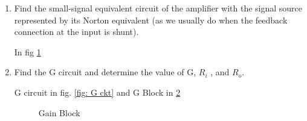 \begin{enumerate}[label=\thesection.\arabic*.,ref=\thesection.\theenumi]
 Applying KCL at collector node
 \begin{multline}
    \frac{V_{o} - 15}{5.6*10^3} + I_{C} + I_{f} = 0\\
     \text{\brak{Since,I_{C} = H I_{B}}}\\
     \frac{V_{o} - 15}{5.6*10^3} + H I_{B} + \brak{I_{B} + I_{S}} = 0\\
     \frac{V_{o} - 15}{5.6*10^3} + \brak{100 + 1}I_{B} + \brak{0.07*10^{-3}} = 0\\
     \implies V_{o} = 14.608 - \brak{565.5*10^3}I_{B} 
     \label{eq:ee17btech11031_fed2}
 \end{multline}
 Subtracting \ref{eq:ee17btech11031_fed1} from \ref{eq:ee17btech11031_fed2}, we get,
 \begin{align}
     I_{B} &= 16.06  \mu A\\
     I_{C} &= I_{E} = H I_{B}\\
     \text{Dc collector Current},  
     I_{C} &= 1.606  mA
 \end{align}
 
 \begin{table}[!ht]
\centering

\caption{}
\label{table:ee17btech11031_spice_Table}
\end{table}

\item Find the small-signal equivalent circuit of the amplifier with the signal source represented by its Norton equivalent (as we usually do when the feedback connection at the input is shunt).

\solution
In fig \ref{fig:sss ckt} 
 \begin{figure}[!ht]
 	\begin{center}
 			\resizebox{\columnwidth}{!}{}
 	\end{center}
 \caption{}
 \label{fig:sss ckt}
 \end{figure}

\item Find the G circuit and determine the value of G, $R_{i}$ ,
and $R_{o}$.

\solution
G circuit in fig. \ref{fig: G ckt} and G Block in \ref{fig: G Block}
 \begin{figure}[!ht]
 	\begin{center}
 			\resizebox{\columnwidth}{!}{}
 	\end{center}
 \caption{Gain Block}
 \label{fig: G Block}
 \end{figure}


\end{enumerate}
